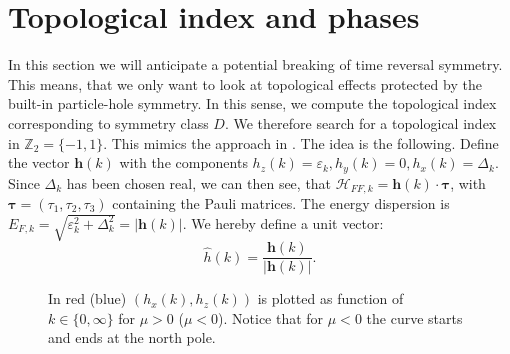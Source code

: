 \section{Topological index and phases}
\label{sec.topindexandphases}
In this section we will anticipate a potential breaking of time reversal symmetry. This means, that we only want to look at topological effects protected by the built-in particle-hole symmetry. In this sense, we compute the topological index corresponding to symmetry class $D$. We therefore search for a topological index in $\mathbb{Z}_2=\{-1,1\}$. This mimics the approach in \cite{Alicea}. The idea is the following. Define the vector $\mathbf{h}(k)$ with the components $h_z(k) = \varepsilon_k, h_y(k) = 0, h_x(k) = \Delta_k$. Since $\Delta_k$ has been chosen real, we can then see, that $\mathcal{H}_{FF,k} = \mathbf{h}(k)\cdot\boldsymbol\tau$, with $\boldsymbol\tau = (\tau_1,\tau_2,\tau_3)$ containing the Pauli matrices. The energy dispersion is $E_{F,k} = \sqrt{\varepsilon^2_k + \Delta^2_k} = |\mathbf{h}(k)|$. We hereby define a unit vector:
\begin{equation}
\hat{h}(k) = \frac{\mathbf{h}(k)}{|\mathbf{h}(k)|}. 
\label{eq.hhatdefinition}
\end{equation}


\begin{figure}
\center
{}
\caption{In red (blue) $(h_x(k),h_z(k))$ is plotted as function of $k\in \{0, \infty\}$ for $\mu > 0$ ($\mu < 0$). Notice that for $\mu < 0$ the curve starts and ends at the north pole.}
\label{fig.hhatplot}
\end{figure}

